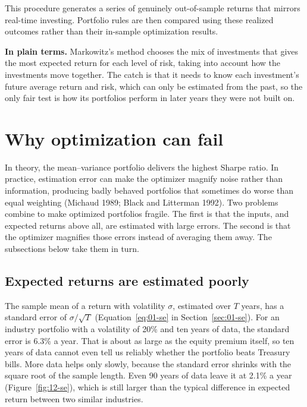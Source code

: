 This procedure generates a series of genuinely out-of-sample returns that mirrors real-time investing. Portfolio rules are then compared using these realized outcomes rather than their in-sample optimization results.

\noindent\textbf{In plain terms.} Markowitz's method chooses the mix of investments that gives the most expected return for each level of risk, taking into account how the investments move together. The catch is that it needs to know each investment's future average return and risk, which can only be estimated from the past, so the only fair test is how its portfolios perform in later years they were not built on.

\section{Why optimization can fail}
\label{sec:12-how}

In theory, the mean--variance portfolio delivers the highest Sharpe ratio. In practice, estimation error can make the optimizer magnify noise rather than information, producing badly behaved portfolios that sometimes do worse than equal weighting (Michaud 1989; Black and Litterman 1992). Two problems combine to make optimized portfolios fragile. The first is that the inputs, and expected returns above all, are estimated with large errors. The second is that the optimizer magnifies those errors instead of averaging them away. The subsections below take them in turn.

\subsection{Expected returns are estimated poorly}
\label{sec:12-estimation}

The sample mean of a return with volatility $\sigma$, estimated over $T$ years, has a standard error of $\sigma/\sqrt{T}$ (Equation~\eqref{eq:01-se} in Section~\ref{sec:01-se}). For an industry portfolio with a volatility of 20\% and ten years of data, the standard error is 6.3\% a year. That is about as large as the equity premium itself, so ten years of data cannot even tell us reliably whether the portfolio beats Treasury bills. More data helps only slowly, because the standard error shrinks with the square root of the sample length. Even 90 years of data leave it at 2.1\% a year (Figure~\ref{fig:12-se}), which is still larger than the typical difference in expected return between two similar industries.

